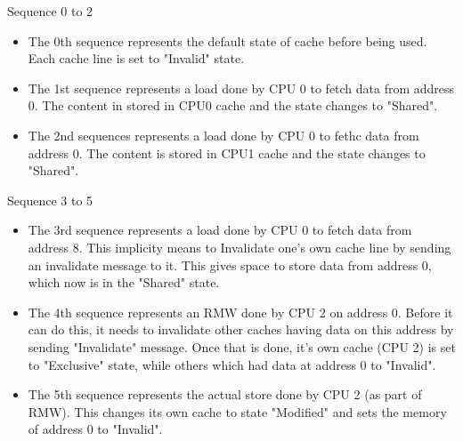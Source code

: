 \documentclass[notes, xcolor = dvipsnames]{beamer}
\begin{document}
    \begin{frame}{Sequence 0 to 2}

        \begin{itemize}
            \item The 0th sequence represents the default state of cache before being used. 
                Each cache line is set to "Invalid" state. 
            \item The 1st sequence represents a load done by CPU 0 to fetch data from address 0. 
                The content in stored in CPU0 cache and the state changes to "Shared".
            \item The 2nd sequences represents a load done by CPU 0 to fethc data from address 0.
                The content is stored in CPU1 cache and the state changes to "Shared".
        \end{itemize}
        
    \end{frame}

    \begin{frame}{Sequence 3 to 5}

        \begin{itemize}
            \item The 3rd sequence represents a load done by CPU 0 to fetch data from address 8.
                This implicity means to Invalidate one's own cache line by sending an invalidate message to it. 
                This gives space to store data from address 0, which now is in the "Shared" state.
            \item The 4th sequence represents an RMW done by CPU 2 on address 0.
                Before it can do this, it needs to invalidate other caches having data on this address by sending "Invalidate" message.
                Once that is done, it's own cache (CPU 2) is set to "Exclusive" state, while others which had data at address 0 to "Invalid".
            \item The 5th sequence represents the actual store done by CPU 2 (as part of RMW).
                This changes its own cache to state "Modified" and sets the memory of address 0 to "Invalid".
        \end{itemize}
        
    \end{frame}
\end{document}
